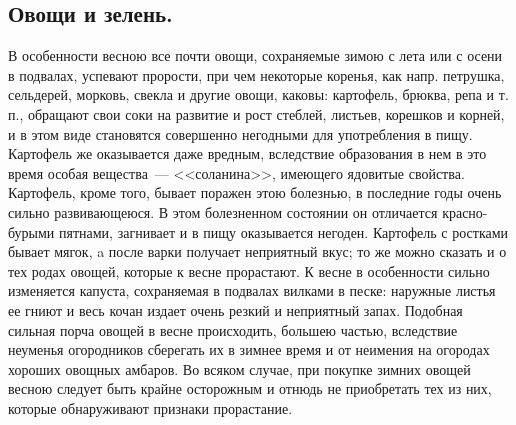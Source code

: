 \subsection{Овощи и зелень.}
В особенности весною все почти овощи, сохраняемые зимою с лета или с осени в подвалах, успевают прорости, при чем некоторые коренья, как напр. петрушка, сельдерей, морковь, свекла и другие овощи, каковы: картофель, брюква, репа и т. п., обращают свои соки на развитие и рост стеблей, листьев, корешков и корней, и в этом виде становятся совершенно негодными для употребления в пищу. Картофель же оказывается даже вредным, вследствие образования в нем в это время особая вещества~--- <<соланина>>, имеющего ядовитые свойства. Картофель, кроме того, бывает поражен этою болезнью, в последние годы очень сильно развивающеюся. В этом болезненном состоянии он отличается красно-бурыми пятнами, загнивает и в пищу оказывается негоден. Картофель с ростками бывает мягок, a после варки получает неприятный вкус; то же можно сказать и о тех родах овощей, которые к весне прорастают. К весне в особенности сильно изменяется капуста, сохраняемая в подвалах вилками в песке: наружные листья ее гниют и весь кочан издает очень резкий и неприятный запах. Подобная сильная порча овощей в весне происходить, большею частью, вследствие неуменья огородников сберегать их в зимнее время и от неимения на огородах хороших овощных амбаров. Во всяком случае, при покупке зимних овощей весною следует быть крайне осторожным и отнюдь не приобретать тех из них, которые обнаруживают признаки прорастание.


